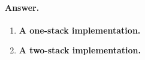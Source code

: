 \paragraph{Answer.}

\begin{enumerate}

  \item \textbf{A one-stack implementation.}

  \item \textbf{A two-stack implementation.}

\end{enumerate}
